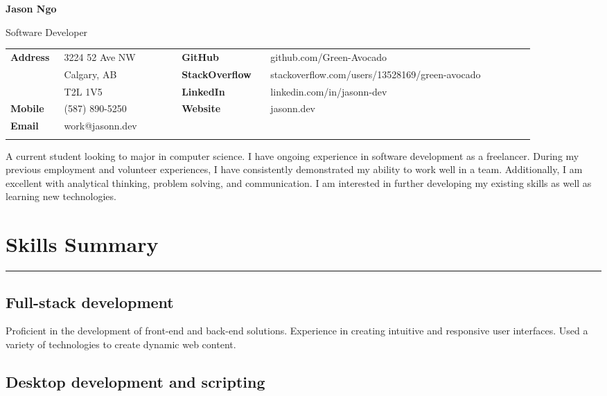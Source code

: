 \documentclass[letterpaper]{article}
\begin{document}
    {\Huge
    \textbf{Jason Ngo}}

    {\large
    Software Developer}

    {\small%
        \renewcommand{\arraystretch}{1.2}
        \begin{tabular}{p{0.08\linewidth} p{0.2\linewidth} p{0.15\linewidth} p{0.45\linewidth}}
            \\
            \textbf{Address} & 3224 52 Ave NW & \textbf{GitHub} & github.com/Green-Avocado \\
            & Calgary, AB & \textbf{StackOverflow} & stackoverflow.com/users/13528169/green-avocado \\
            & T2L 1V5 & \textbf{LinkedIn} & linkedin.com/in/jasonn-dev \\
            \textbf{Mobile} & (587) 890-5250 & \textbf{Website} & jasonn.dev \\
            \textbf{Email} & work@jasonn.dev \\
            \\
        \end{tabular}
    }

    A current student looking to major in computer science.
    I have ongoing experience in software development as a freelancer.
    During my previous employment and volunteer experiences, I have consistently demonstrated my ability to work well in a team.
    Additionally, I am excellent with analytical thinking, problem solving, and communication.
    I am interested in further developing my existing skills as well as learning new technologies.

    \section*{Skills Summary}

        \rule{\linewidth}{0.2pt}

        \subsection*{Full-stack development}

        Proficient in the development of front-end and back-end solutions.
        Experience in creating intuitive and responsive user interfaces.
        Used a variety of technologies to create dynamic web content.

        \subsection*{Desktop development and scripting}
\end{document}
